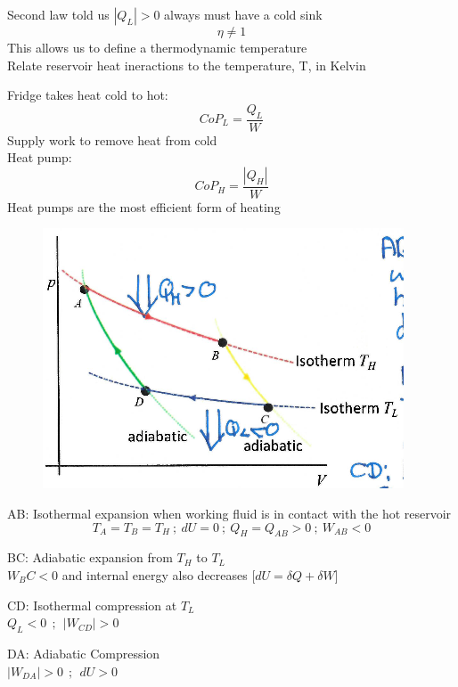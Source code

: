 \documentclass[a4paper, 11pt, normalem]{report}
\begin{document}
Second law told us $|Q_L| > 0$ always must have a cold sink
$$\eta \neq 1$$
This allows us to define a thermodynamic temperature \\
Relate reservoir heat ineractions to the temperature, T, in Kelvin

Fridge takes heat cold to hot:
\begin{equation*}
    CoP_{L} = \frac{Q_L}{W}
\end{equation*}
Supply work to remove heat from cold \\
Heat pump:
\begin{equation*}
    CoP_H = \frac{|Q_H|}{W}
\end{equation*}
Heat pumps are the most efficient form of heating

\begin{figure}
    \begin{center}
        \includegraphics[scale=0.4]{Adiab.png}
        \vspace{-20pt}
    \end{center}
\end{figure}

AB: Isothermal expansion when working fluid is in contact with the hot reservoir
\begin{equation*}
    T_A = T_B = T_H ~;~ dU = 0 ~;~ Q_H = Q_{AB} > 0 ~;~ W_{AB} < 0
\end{equation*}

BC: Adiabatic expansion from $T_H$ to $T_L$ \\
          $W_BC < 0$ and internal energy also decreases [$dU = \delta Q + \delta W$]

CD: Isothermal compression at $T_L$ \\
          $Q_L < 0 ~~;~~ |W_{CD}| > 0$

DA: Adiabatic Compression \\
          $|W_{DA}| > 0 ~~;~~ dU > 0$
\end{document}
